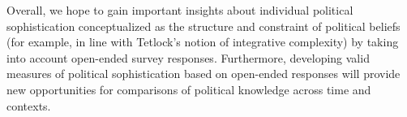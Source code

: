 \documentclass[12pt]{article}
\begin{document}
Overall, we hope to gain important insights about individual political sophistication conceptualized as the structure and constraint of political beliefs (for example, in line with Tetlock's \citeyear{tetlock1983cognitive} notion of integrative complexity) by taking into account open-ended survey responses. Furthermore, developing valid measures of political sophistication based on open-ended responses will provide new opportunities for comparisons of political knowledge across time and contexts.

\newpage
\renewcommand{\section}[2]{\subsubsection#1{#2}} %


\end{document}
